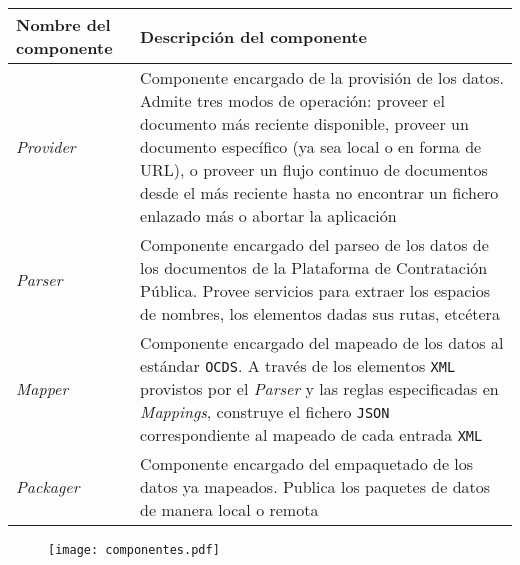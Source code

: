             \begin{center}
                \begin{tabular}{|| M{3cm} | M{12cm} ||} 
                    \hline
                        Nombre del componente & Descripción del componente \\
                    \hline\hline
                        \textit{\large Provider} & Componente encargado de la provisión de los datos. Admite tres modos de operación: proveer el documento más reciente disponible, proveer un documento específico (ya sea local o en forma de URL), o proveer un flujo continuo de documentos desde el más reciente hasta no encontrar un fichero enlazado más o abortar la aplicación \\ 
                    \hline
                        \textit{\large Parser} & Componente encargado del parseo de los datos de los documentos de la Plataforma de Contratación Pública. Provee servicios para extraer los espacios de nombres, los elementos dadas sus rutas, etcétera  \\
                    \hline
                        \textit{\large Mapper} & Componente encargado del mapeado de los datos al estándar \texttt{OCDS}. A través de los elementos \texttt{XML} provistos por el \textit{Parser} y las reglas especificadas en \textit{Mappings}, construye el fichero \texttt{JSON} correspondiente al mapeado de cada entrada \texttt{XML} \\
                    \hline
                        \textit{\large Packager} & Componente encargado del empaquetado de los datos ya mapeados. Publica los paquetes de datos de manera local o remota \\
                    \hline
                \end{tabular}
            \end{center}
            
            \vspace{0.3cm}
            
            \begin{figure}[h]
                \centering
                \texttt{[image: componentes.pdf]}
                \label{fig:componentes}
            \end{figure}
            
